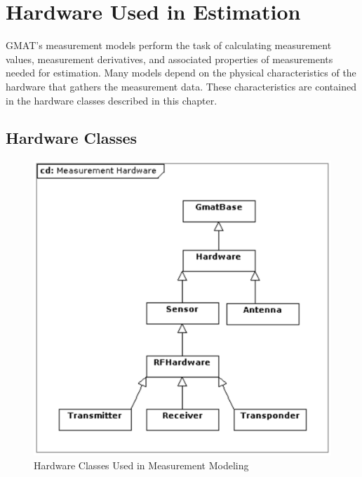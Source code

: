 \chapter{Hardware Used in Estimation}


GMAT's measurement models perform the task of calculating measurement values,
measurement derivatives, and associated properties of measurements needed for
estimation.  Many models depend on the physical characteristics of the hardware
that gathers the measurement data.  These characteristics are contained in the
hardware classes described in this chapter.

\section{Hardware Classes}

\begin{figure}[htbp]
\begin{center}
\includegraphics[scale=0.6]{Images/MeasurementHardware.eps}
\caption{\label{fig:MeasurementHardware}Hardware Classes Used in Measurement
Modeling}
\end{center}
\end{figure}

